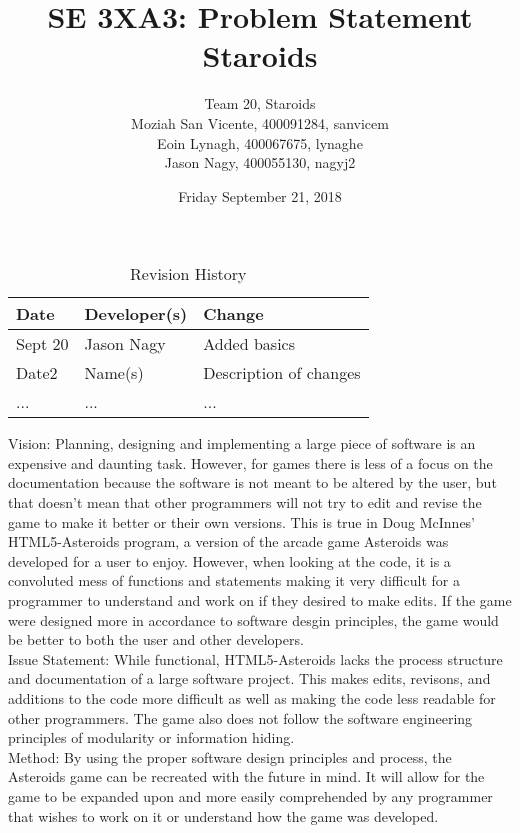 \documentclass{article}
\title{SE 3XA3: Problem Statement\\Staroids}
\author{Team 20, Staroids
		\\ Moziah San Vicente, 400091284, sanvicem
		\\ Eoin Lynagh, 400067675, lynaghe
		\\ Jason Nagy, 400055130, nagyj2
}
\date{Friday September 21, 2018}
\begin{document}
\begin{table}[hp]
\caption{Revision History} \label{TblRevisionHistory}
\begin{tabularx}{\textwidth}{llX}
\toprule
\textbf{Date} & \textbf{Developer(s)} & \textbf{Change}\\
\midrule
Sept 20 & Jason Nagy & Added basics\\
Date2 & Name(s) & Description of changes\\
... & ... & ...\\
\bottomrule
\end{tabularx}
\end{table}

\newpage

\maketitle

Vision: Planning, designing and implementing a large piece of software is an expensive and
daunting task. However, for games there is less of a focus on the documentation because the
software is not meant to be altered by the user, but that doesn't mean that other programmers
will not try to edit and revise the game to make it better or their own versions.
This is true in Doug McInnes' HTML5-Asteroids program, a version of the arcade game Asteroids
was developed for a user to enjoy. However, when looking at the code, it is a convoluted mess of
functions and statements making it very difficult for a programmer to understand and work on
if they desired to make edits. If the game were designed more in accordance to software desgin
principles, the game would be better to both the user and other developers.
\\Issue Statement: While functional, HTML5-Asteroids lacks the process structure and
documentation of a large software project. This makes edits, revisons, and additions to the
code more difficult as well as making the code less readable for other programmers. The game
also does not follow the software engineering principles of modularity or information hiding.
\\Method: By using the proper software design principles and process, the Asteroids game can
be recreated with the future in mind. It will allow for the game to be expanded upon and more
easily comprehended by any programmer that wishes to work on it or understand how the game was
developed.
\end{document}
